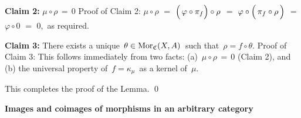 \vskip 0.3cm
\noindent
\textbf{Claim 2:}\;\; $\mu \circ \rho \,=\, 0$
\vskip 0.1cm
\noindent
Proof of Claim 2:\;
$\mu \circ \rho$
\;$=$\; $\left(\,\varphi \overset{{\color{white}1}}{\circ} \pi_{f}\right)\circ \rho$
\;$=$\; $\varphi \circ \left(\, \pi_{f} \overset{{\color{white}1}}{\circ} \rho\, \right)$
\;$=$\; $\varphi \circ 0$
\;$=$\; $0$,\,
as required.

\vskip 0.3cm
\noindent
\textbf{Claim 3:}\;\;
There exists a unique \,$\theta \in \textnormal{Mor}_{\mathfrak{C}}(X,A)$\, such that \,$\rho = f \circ \theta$.
\vskip 0.1cm
\noindent
Proof of Claim 3:\;
This follows immediately from two facts:
(a)	\,$\mu \circ \rho \,=\, 0$ (Claim 2), and
(b)	the universal property of \,$f = \kappa_{\mu}$\, as a kernel of \,$\mu$.

\vskip 0.3cm
\noindent
This completes the proof of the Lemma.
\qed


\vskip 1.0cm
\noindent
\textbf{\large Images and coimages of morphisms in an arbitrary category}


